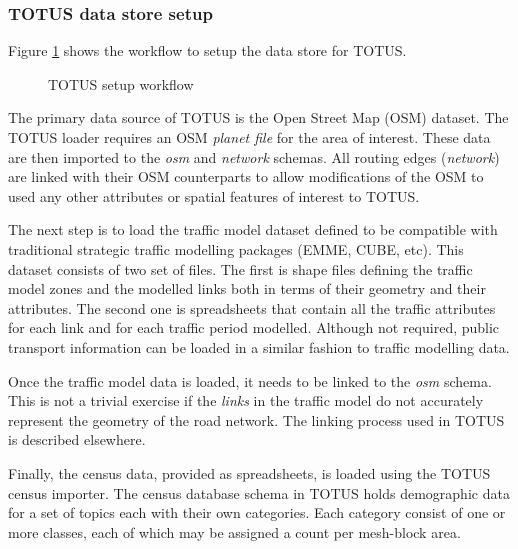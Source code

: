 \subsubsection{TOTUS data store setup}
Figure \ref{fig:totus_setup_flow} shows the workflow to setup the data store for TOTUS.
\begin{landscape}
	\begin{figure}[h]
		 \caption{TOTUS setup workflow}
		 \label{fig:totus_setup_flow}
	\end{figure}
\end{landscape}

The primary data source of TOTUS is the Open Street Map (OSM) dataset. The TOTUS
loader requires an OSM \textit{planet file} for the area of interest. These data are then imported to the \textit{osm}  and \textit{network} schemas.  All routing edges (\textit{network}) are linked with their OSM counterparts to allow modifications of the OSM to used any other attributes or spatial features of interest to TOTUS.

The next step is to load the traffic model dataset defined to be compatible with traditional strategic traffic modelling packages (EMME, CUBE, etc). This dataset consists of two set of files. The first is shape files defining the traffic model zones and the modelled links both in terms of their geometry and their attributes. The second one is spreadsheets that contain all the traffic attributes for each link and for each traffic period modelled. Although not required, public transport information can be loaded in a similar fashion to traffic modelling data.

Once the traffic model data is loaded, it needs to be linked to the \textit{osm} schema. This is not a trivial exercise if the \textit{links} in the traffic model do not accurately represent the geometry of the road network. The linking process used in TOTUS is described elsewhere\cite{dummy_temp}. 

Finally, the census data, provided as spreadsheets, is loaded using the TOTUS census importer. The census
database schema in TOTUS holds demographic data for a set of topics
each with their own categories. Each category consist of one or more
classes, each of which may be assigned a count per mesh-block area.

